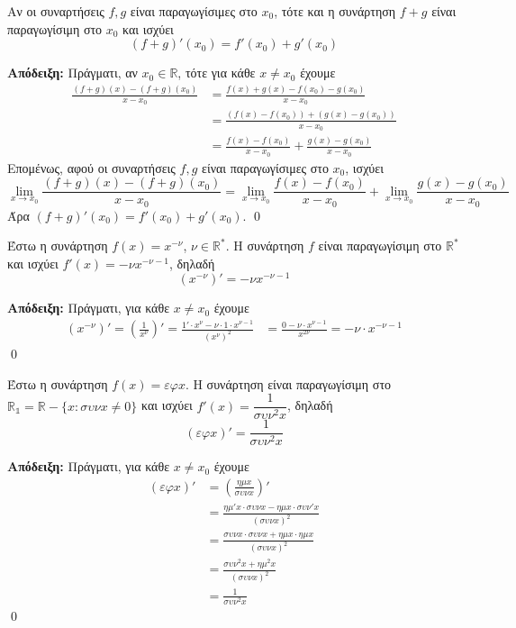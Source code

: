 \documentclass[a4paper, 12pt]{article}
\renewenvironment{proof}[1][\textbf{Απόδειξη}]{%
  \par\noindent\textbf{#1:} \rmfamily}{\qed\par}
\begin{document}
\begin{theorem}{}
  Αν οι συναρτήσεις $f,g$ είναι παραγωγίσιμες στο $x_0$, τότε και η συνάρτηση $f+g$ είναι παραγωγίσιμη στο $x_0$ και ισχύει
  $$(f+g)'(x_0)=f'(x_0)+g'(x_0)$$
\end{theorem}
\begin{proof}
  Πράγματι, αν $x_0\in\mathbb{R}$, τότε για κάθε $x\ne x_0$ έχουμε
  \begin{align*}
    \frac{(f+g)(x)-(f+g)(x_0)}{x-x_0} & =\frac{f(x)+g(x)-f(x_0)-g(x_0)}{x-x_0}               \\
                                      & =\frac{(f(x)-f(x_0))+(g(x)-g(x_0))}{x-x_0}           \\
                                      & =\frac{f(x)-f(x_0)}{x-x_0}+\frac{g(x)-g(x_0)}{x-x_0}
  \end{align*}
  Επομένως, αφού οι συναρτήσεις $f,g$ είναι παραγωγίσιμες στο $x_0$, ισχύει
  $$\lim_{x\to x_0}\frac{(f+g)(x)-(f+g)(x_0)}{x-x_0}=\lim_{x\to x_0}\frac{f(x)-f(x_0)}{x-x_0}+\lim_{x\to x_0}\frac{g(x)-g(x_0)}{x-x_0}$$
  Άρα $(f+g)'(x_0)=f'(x_0)+g'(x_0)$.
\end{proof}

\begin{theorem}{}
  Έστω η συνάρτηση $f(x)=x^{-ν}$, $ν\in\mathbb{R}^*$. Η συνάρτηση $f$ είναι παραγωγίσιμη στο $\mathbb{R}^*$ και ισχύει $f'(x)=-νx^{-ν-1}$, δηλαδή
  $$(x^{-ν})'=-νx^{-ν-1}$$
\end{theorem}
\begin{proof}
  Πράγματι, για κάθε $x\ne x_0$ έχουμε
  \begin{align*}
    (x^{-ν})'=\left( \frac{1}{x^ν} \right)'=\frac{1'\cdot x^{ν}-ν\cdot 1\cdot x^{ν-1}}{(x^ν)^2} & =\frac{0-ν \cdot x^{ν-1}}{x^{2ν}}=-ν\cdot x^{-ν-1}
  \end{align*}
\end{proof}

\begin{theorem}{}
  Έστω η συνάρτηση $f(x)=εφx$. Η συνάρτηση είναι παραγωγίσιμη στο $\mathbb{R_1}=\mathbb{R}-\{x:συνx\ne 0\}$ και ισχύει $f'(x)=\dfrac{1}{συν^2x}$, δηλαδή
  $$(εφx)'=\frac{1}{συν^2x}$$
\end{theorem}
\begin{proof}
  Πράγματι, για κάθε $x\ne x_0$ έχουμε
  \begin{align*}
    (εφx)' & =\left( \frac{ημx}{συνx}\right)'                \\
           & =\frac{ημ'x\cdot συνx-ημx\cdot συν'x}{(συνx)^2} \\
           & =\frac{συνx\cdot συνx+ημx\cdot ημx}{(συνx)^2}   \\
           & =\frac{συν^2x+ημ^2x}{(συνx)^2}                  \\
           & =\frac{1}{συν^2x}
  \end{align*}
\end{proof}
\end{document}
